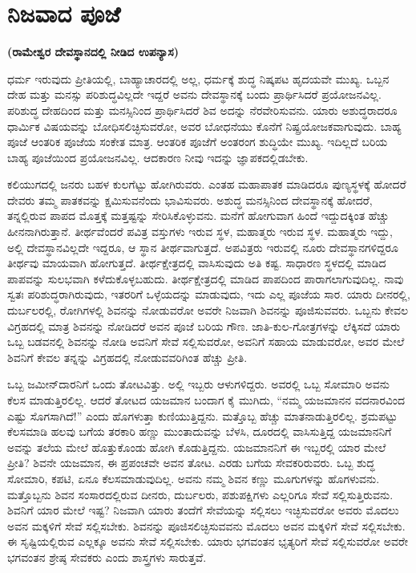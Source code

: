
\chapter{ನಿಜವಾದ ಪೂಜೆ}

\begin{center}
\textbf{(ರಾಮೇಶ್ವರ ದೇವಸ್ಥಾನದಲ್ಲಿ ನೀಡಿದ ಉಪನ್ಯಾಸ)}
\end{center}

ಧರ್ಮ ಇರುವುದು ಪ್ರೀತಿಯಲ್ಲಿ, ಬಾಹ್ಯಾಚಾರದಲ್ಲಿ ಅಲ್ಲ, ಧರ್ಮಕ್ಕೆ ಶುದ್ಧ ನಿಷ್ಕಪಟ ಹೃದಯವೇ ಮುಖ್ಯ. ಒಬ್ಬನ ದೇಹ ಮತ್ತು ಮನಸ್ಸು ಪರಿಶುದ್ಧವಿಲ್ಲದೇ ಇದ್ದರೆ ಅವನು ದೇವಸ್ಥಾನಕ್ಕೆ ಬಂದು ಪ್ರಾರ್ಥಿಸಿದರೆ ಪ್ರಯೋಜನವಿಲ್ಲ. ಪರಿಶುದ್ಧ ದೇಹದಿಂದ ಮತ್ತು ಮನಸ್ಸಿನಿಂದ ಪ್ರಾರ್ಥಿಸಿದರೆ ಶಿವ ಅದನ್ನು ನೆರವೇರಿಸುವನು. ಯಾರು ಅಶುದ್ಧ\-ರಾದರೂ ಧಾರ್ಮಿಕ ವಿಷಯವನ್ನು ಬೋಧಿಸಲಿಚ್ಛಿಸುವರೋ, ಅವರ ಬೋಧನೆಯು ಕೊನೆಗೆ ನಿಷ್ಪ್ರಯೋಜಕವಾಗುವುದು. ಬಾಹ್ಯ ಪೂಜೆ ಆಂತರಿಕ ಪೂಜೆಯ ಸಂಕೇತ ಮಾತ್ರ. ಆಂತರಿಕ\- ಪೂಜೆಗೆ ಅಂತರಂಗ ಶುದ್ಧಿಯೇ ಮುಖ್ಯ. ಇದಿಲ್ಲದೆ ಬರಿಯ ಬಾಹ್ಯ ಪೂಜೆಯಿಂದ ಪ್ರಯೋಜನವಿಲ್ಲ. ಆದಕಾರಣ ನೀವು ಇದನ್ನು ಜ್ಞಾಪಕದಲ್ಲಿಡಬೇಕು.

ಕಲಿಯುಗದಲ್ಲಿ ಜನರು ಬಹಳ ಕುಲಗೆಟ್ಟು ಹೋಗಿರುವರು. ಎಂತಹ ಮಹಾಪಾತಕ ಮಾಡಿದರೂ ಪುಣ್ಯಸ್ಥಳಕ್ಕೆ ಹೋದರೆ ದೇವರು ತಮ್ಮ ಪಾತಕವನ್ನು ಕ್ಷಮಿಸುವನೆಂದು ಭಾವಿಸುವರು. ಅಶುದ್ಧ ಮನಸ್ಸಿನಿಂದ ದೇವಸ್ಥಾನಕ್ಕೆ ಹೋದರೆ, ತನ್ನಲ್ಲಿರುವ ಪಾಪದ ಮೊತ್ತಕ್ಕೆ ಮತ್ತಷ್ಟನ್ನು ಸೇರಿಸಿಕೊಳ್ಳುವನು. ಮನೆಗೆ ಹೋಗುವಾಗ ಹಿಂದೆ ಇದ್ದುದಕ್ಕಿಂತ ಹೆಚ್ಚು ಹೀನನಾಗಿರುತ್ತಾನೆ. ತೀರ್ಥವೆಂದರೆ ಪವಿತ್ರ ವಸ್ತುಗಳು ಇರುವ ಸ್ಥಳ, ಮಹಾತ್ಮರು ಇರುವ ಸ್ಥಳ. ಮಹಾತ್ಮರು ಇದ್ದು, ಅಲ್ಲಿ ದೇವಸ್ಥಾನವಿಲ್ಲದೇ ಇದ್ದರೂ, ಆ ಸ್ಥಾನ ತೀರ್ಥವಾಗುತ್ತದೆ. ಅಪವಿತ್ರರು ಇರುವಲ್ಲಿ ನೂರು ದೇವಸ್ಥಾನಗಳಿದ್ದರೂ ತೀರ್ಥವು ಮಾಯವಾಗಿ ಹೋಗುತ್ತದೆ. ತೀರ್ಥಕ್ಷೇತ್ರದಲ್ಲಿ ವಾಸಿಸುವುದು ಅತಿ ಕಷ್ಟ. ಸಾಧಾರಣ ಸ್ಥಳದಲ್ಲಿ ಮಾಡಿದ ಪಾಪವನ್ನು ಸುಲಭವಾಗಿ ಕಳೆದುಕೊಳ್ಳಬಹುದು. ತೀರ್ಥಕ್ಷೇತ್ರದಲ್ಲಿ ಮಾಡಿದ ಪಾಪದಿಂದ ಪಾರಾಗಲಾಗುವುದಿಲ್ಲ. ನಾವು ಸ್ವತಃ ಪರಿಶುದ್ಧರಾಗಿರುವುದು, ಇತರರಿಗೆ ಒಳ್ಳೆಯದನ್ನು ಮಾಡುವುದು, ಇದು ಎಲ್ಲ ಪೂಜೆಯ ಸಾರ. ಯಾರು ದೀನರಲ್ಲಿ, ದುರ್ಬಲರಲ್ಲಿ, ರೋಗಿಗಳಲ್ಲಿ ಶಿವನನ್ನು ನೋಡುವರೋ ಅವರೇ ನಿಜವಾಗಿ ಶಿವನನ್ನು ಪೂಜಿಸುವವರು. ಒಬ್ಬನು ಕೇವಲ ವಿಗ್ರಹದಲ್ಲಿ ಮಾತ್ರ ಶಿವನನ್ನು ನೋಡಿದರೆ ಅವನ ಪೂಜೆ ಬರಿಯ ಗೌಣ. ಜಾತಿ-ಕುಲ-ಗೋತ್ರಗಳನ್ನು ಲೆಕ್ಕಿಸದೆ ಯಾರು ಒಬ್ಬ ಬಡವನಲ್ಲಿ ಶಿವನನ್ನು ನೋಡಿ ಅವನಿಗೆ ಸೇವೆ ಸಲ್ಲಿಸುವರೋ, ಅವನಿಗೆ ಸಹಾಯ ಮಾಡುವರೋ, ಅವರ ಮೇಲೆ ಶಿವನಿಗೆ ಕೇವಲ ತನ್ನನ್ನು ವಿಗ್ರಹದಲ್ಲಿ ನೋಡುವವರಿಗಿಂತ ಹೆಚ್ಚು ಪ್ರೀತಿ.

ಒಬ್ಬ ಜಮೀನ್​ದಾರನಿಗೆ ಒಂದು ತೋಟವಿತ್ತು. ಅಲ್ಲಿ ಇಬ್ಬರು ಆಳುಗಳಿದ್ದರು. ಅವರಲ್ಲಿ ಒಬ್ಬ ಸೋಮಾರಿ ಅವನು ಕೆಲಸ ಮಾಡುತ್ತಿರಲಿಲ್ಲ. ಆದರೆ ತೋಟದ ಯಜಮಾನ ಬಂದಾಗ ಕೈ ಮುಗಿದು, “ನಮ್ಮ ಯಜಮಾನನ ವದನಾರವಿಂದ ಎಷ್ಟು ಸೊಗಸಾಗಿದೆ!” ಎಂದು ಹೊಗಳುತ್ತಾ ಕುಣಿಯುತ್ತಿದ್ದನು. ಮತ್ತೊಬ್ಬ ಹೆಚ್ಚು ಮಾತನಾಡುತ್ತಿರಲಿಲ್ಲ. ಶ್ರಮಪಟ್ಟು ಕೆಲಸಮಾಡಿ ಹಲವು ಬಗೆಯ ತರಕಾರಿ ಹಣ್ಣು ಮುಂತಾದುವನ್ನು ಬೆಳಸಿ, ದೂರದಲ್ಲಿ ವಾಸಿಸುತ್ತಿದ್ದ ಯಜಮಾನನಿಗೆ ಅವನ್ನು ತಲೆಯ ಮೇಲೆ ಹೊತ್ತುಕೊಂಡು ಹೋಗಿ ಕೊಡುತ್ತಿದ್ದನು. ಯಜಮಾನನಿಗೆ ಈ ಇಬ್ಬರಲ್ಲಿ ಯಾರ ಮೇಲೆ ಪ್ರೀತಿ? ಶಿವನೇ ಯಜಮಾನ, ಈ ಪ್ರಪಂಚವೇ ಅವನ ತೋಟ. ಎರಡು ಬಗೆಯ ಸೇವಕರಿರುವರು. ಒಬ್ಬ ಶುದ್ಧ ಸೋಮಾರಿ, ಕಪಟಿ, ಏನೂ ಕೆಲಸಮಾಡುವುದಿಲ್ಲ. ಅವನು ನಮ್ಮ ಶಿವನ ಕಣ್ಣು ಮೂಗುಗಳನ್ನು ಹೊಗಳುವನು. ಮತ್ತೊಬ್ಬನು ಶಿವನ ಸಂಸಾರದಲ್ಲಿರುವ ದೀನರು, ದುರ್ಬಲರು, ಪಶುಪಕ್ಷಿಗಳು ಎಲ್ಲರಿಗೂ ಸೇವೆ ಸಲ್ಲಿಸುತ್ತಿರುವನು. ಶಿವನಿಗೆ ಯಾರ ಮೇಲೆ ಇಷ್ಟ? ನಿಜವಾಗಿ ಯಾರು ತಂದೆಗೆ ಸೇವೆಯನ್ನು ಸಲ್ಲಿಸಲು ಇಚ್ಛಿಸುವರೋ ಅವರು ಮೊದಲು ಅವನ ಮಕ್ಕಳಿಗೆ ಸೇವೆ ಸಲ್ಲಿಸಬೇಕು. ಶಿವನನ್ನು ಪೂಜಿಸಲಿಚ್ಛಿಸುವವನು ಮೊದಲು ಅವನ ಮಕ್ಕಳಿಗೆ ಸೇವೆ ಸಲ್ಲಿಸಬೇಕು. ಈ ಸೃಷ್ಟಿಯಲ್ಲಿರುವ ಎಲ್ಲಕ್ಕೂ ಅವನು ಸೇವೆ ಸಲ್ಲಿಸಬೇಕು. ಯಾರು ಭಗವಂತನ ಭೃತ್ಯರಿಗೆ ಸೇವೆ ಸಲ್ಲಿಸುವರೋ ಅವರೇ ಭಗವಂತನ ಶ್ರೇಷ್ಠ ಸೇವಕರು ಎಂದು ಶಾಸ್ತ್ರಗಳು ಸಾರುತ್ತವೆ.

